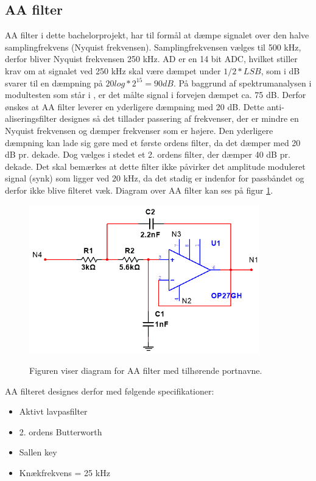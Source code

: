 \subsection{AA filter}

AA filter i dette bachelorprojekt, har til formål at dæmpe signalet over den halve samplingfrekvens (Nyquist frekvensen). Samplingfrekvensen vælges til 500 kHz, derfor bliver Nyquist frekvensen 250 kHz. AD er en 14 bit ADC, hvilket stiller krav om at signalet ved 250 kHz skal være dæmpet under $1/2*LSB$, som i dB svarer til en dæmpning på $20log*2^{15}=90dB$. På baggrund af spektrumanalysen i modultesten som står i , er det målte signal i forvejen dæmpet ca. 75 dB. Derfor ønskes at AA filter leverer en yderligere dæmpning med 20 dB. Dette anti-aliseringsfilter designes så det tillader passering af frekvenser, der er mindre en Nyquist frekvensen og dæmper frekvenser som er højere. Den yderligere dæmpning kan lade sig gøre med et første ordens filter, da det dæmper med 20 dB pr. dekade. Dog vælges i stedet et 2. ordens filter, der dæmper 40 dB pr. dekade. Det skal bemærkes at dette filter ikke påvirker det amplitude moduleret signal (synk) som ligger ved 20 kHz, da det stadig er indenfor for passbåndet og derfor ikke blive filteret væk. Diagram over AA filter kan ses på figur \ref{fig:aafilterdiagram}.

\begin{figure}[H]
\centering
{\includegraphics[width=10cm]
{Figure/aafilterdiagram}}
\caption{Figuren viser diagram for AA filter med tilhørende portnavne.}
\label{fig:aafilterdiagram}
\end{figure}


AA filteret designes derfor med følgende specifikationer:
\begin{itemize}
\item Aktivt lavpasfilter
\item 2. ordens Butterworth
\item Sallen key
\item Knækfrekvens = 25 kHz
\end{itemize}

